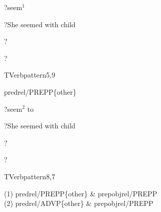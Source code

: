 \begin{thetadescr}
\evitem  ?seem$^{1}$
\esitem
     \begin{examples}
        \example  ?She seemed with child
     \end{examples}
\end{thetadescr}



\begin{thetadescr}
\evitem ?
\esitem
     \begin{examples}
        \example ?
     \end{examples}
\end{thetadescr}


\newpage
{}
\begin{vpattern}
 TVerbpattern5,9
\csritem \mbox{}\\
     \begin{csr}
       predrel/PREPP\{other\} 
     \end{csr}
\remarksitem
\end{vpattern}


\begin{thetadescr}
\evitem  ?seem$^{2}$ to
\esitem
     \begin{examples}
        \example  ?She seemed with child
     \end{examples}
\end{thetadescr}



\begin{thetadescr}
\evitem ?
\esitem
     \begin{examples}
        \example ?
     \end{examples}
\end{thetadescr}


\newpage
{}
\begin{vpattern}
 TVerbpattern8,7
\csritem \mbox{}\\
     \begin{csr}
      (1) predrel/PREPP\{other\} & prepobjrel/PREPP\\
      (2) predrel/ADVP\{other\} & prepobjrel/PREPP
     \end{csr}
\remarksitem
\end{vpattern}


